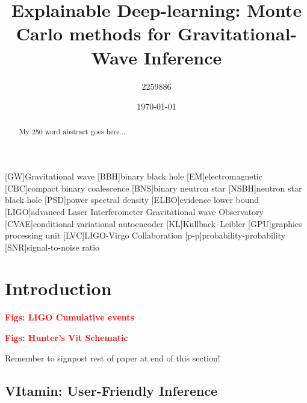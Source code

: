\documentclass[prd,superscriptaddress,twocolumn,nopreprintnumbers,floatfix]{revtex4}
\newcommand{\vitamin}{{\sc VItamin}\xspace}
\begin{document}
\title{Explainable Deep-learning: Monte Carlo methods for Gravitational-Wave Inference}

\author{2259886}
%

\date{\today}

\begin{abstract}
My 250 word abstract goes here...
\end{abstract}

\maketitle

[GW]{Gravitational wave}
[BBH]{binary black hole}
[EM]{electromagnetic}
[CBC]{compact binary coalescence}
[BNS]{binary neutron star}
[NSBH]{neutron star black hole}
[PSD]{power spectral density}
[ELBO]{evidence lower bound}
[LIGO]{advanced Laser Interferometer Gravitational wave Observatory}
[CVAE]{conditional variational autoencoder}
[KL]{Kullback--Leibler}
[GPU]{graphics processing unit}
[LVC]{LIGO-Virgo Collaboration}
[p-p]{probability-probability}
[SNR]{signal-to-noise ratio}

\section{Introduction}\label{intro}

\textbf{\textcolor{red}{Figs: LIGO Cumulative events}}

\textbf{\textcolor{red}{Figs: Hunter's Vit Schematic}}



Remember to signpost rest of paper at end of this section!

%
\subsection{\vitamin: User-Friendly Inference}\label{vit}
%
%
%
\end{document}
